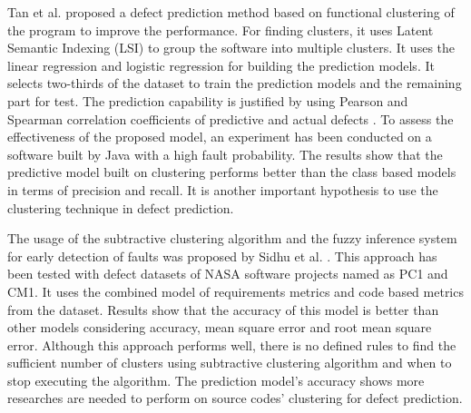 \documentclass[12pt]{report}
\begin{document}
Tan et al. proposed a defect prediction method based on functional clustering of the program to improve the performance\cite{tan2011assessing}. For finding clusters, it uses Latent Semantic Indexing (LSI) to group the software into multiple clusters. It uses the linear regression and logistic regression for building the prediction models. It selects two-thirds of the dataset to train the prediction models and the remaining part for test. The prediction capability is justified by using Pearson and Spearman correlation coefficients of predictive and actual defects \cite{cohen2013applied}. To assess the effectiveness of the proposed model, an experiment has been conducted on a software built by Java with a high fault probability. The results show that the predictive model built on clustering performs better than the class based models in terms of precision and recall. It is another important hypothesis to use the clustering technique in defect prediction.

The usage of the subtractive clustering algorithm and the fuzzy inference system for early detection of faults was proposed by Sidhu et al. \cite{sidhu2010subtractive}. This approach has been tested with defect datasets of NASA software projects named as PC1 and CM1. It uses the combined model of requirements metrics and code based metrics from the dataset. Results show that the accuracy of this model is better than other models considering accuracy, mean square error and root mean square error. Although this approach performs well, there is no defined rules to find the sufficient number of clusters using subtractive clustering algorithm and when to stop executing the algorithm. The prediction model's accuracy shows more researches are needed to perform on source codes' clustering for defect prediction. 

\end{document}
